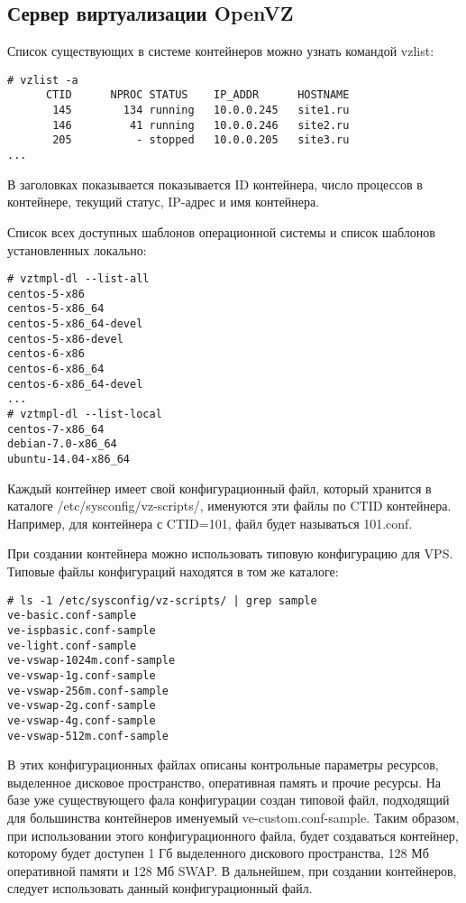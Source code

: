 \subsection{Сервер виртуализации OpenVZ}

Список существующих в системе контейнеров можно узнать командой vzlist:
\begin{lstlisting}
# vzlist -a
      CTID      NPROC STATUS    IP_ADDR      HOSTNAME
       145        134 running   10.0.0.245   site1.ru
       146         41 running   10.0.0.246   site2.ru
       205          - stopped   10.0.0.205   site3.ru
...
\end{lstlisting}

В заголовках показывается показывается ID контейнера, число процессов в контейнере, текущий статус, IP-адрес и имя контейнера.

Список всех доступных шаблонов операционной системы и список шаблонов установленных локально:
\begin{lstlisting}
# vztmpl-dl --list-all
centos-5-x86
centos-5-x86_64
centos-5-x86_64-devel
centos-5-x86-devel
centos-6-x86
centos-6-x86_64
centos-6-x86_64-devel
...
# vztmpl-dl --list-local
centos-7-x86_64
debian-7.0-x86_64
ubuntu-14.04-x86_64
\end{lstlisting}

Каждый контейнер имеет свой конфигурационный файл, который хранится в каталоге /etc/sysconfig/vz-scripts/, именуются эти файлы по CTID контейнера.
Например, для контейнера с CTID=101, файл будет называться 101.conf.

При создании контейнера можно использовать типовую конфигурацию для VPS.
Типовые файлы конфигураций находятся в том же каталоге:
\begin{lstlisting}
# ls -1 /etc/sysconfig/vz-scripts/ | grep sample
ve-basic.conf-sample
ve-ispbasic.conf-sample
ve-light.conf-sample
ve-vswap-1024m.conf-sample
ve-vswap-1g.conf-sample
ve-vswap-256m.conf-sample
ve-vswap-2g.conf-sample
ve-vswap-4g.conf-sample
ve-vswap-512m.conf-sample
\end{lstlisting}

В этих конфигурационных файлах описаны контрольные параметры ресурсов, выделенное дисковое пространство, оперативная память и прочие ресурсы.
На базе уже существующего фала конфигурации создан типовой файл, подходящий для большинства контейнеров именуемый ve-custom.conf-sample.
Таким образом, при использовании этого конфигурационного файла, будет создаваться контейнер, которому будет доступен 1 Гб выделенного дискового пространства, 128 Мб оперативной памяти и 128 Мб SWAP.
В дальнейшем, при создании контейнеров, следует использовать данный конфигурационный файл.

